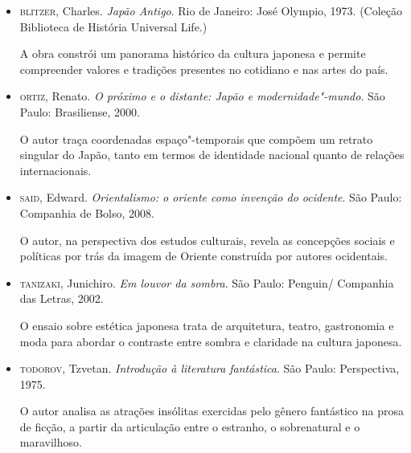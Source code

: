 \documentclass[12pt]{extarticle}
\begin{document}
\begin{itemize}
\item\textsc{blitzer}, Charles. \textit{Japão Antigo}. Rio de Janeiro: José Olympio,
1973. (Coleção Biblioteca de História Universal Life.)

  A obra constrói um panorama histórico da cultura japonesa e permite
  compreender valores e tradições presentes no cotidiano e nas artes do
  país.

\item\textsc{ortiz}, Renato. \textit{O próximo e o distante: Japão e
modernidade"-mundo}. São Paulo: Brasiliense, 2000.

  O autor traça coordenadas espaço"-temporais que compõem um retrato
  singular do Japão, tanto em termos de identidade nacional quanto de
  relações internacionais.

\item\textsc{said}, Edward. \textit{Orientalismo: o oriente como invenção do
ocidente}. São Paulo: Companhia de Bolso, 2008.

  O autor, na perspectiva dos estudos culturais, revela as concepções
  sociais e políticas por trás da imagem de Oriente construída por
  autores ocidentais.

\item\textsc{tanizaki}, Junichiro. \textit{Em louvor da sombra}. São Paulo: Penguin/
Companhia das Letras, 2002.

  O ensaio sobre estética japonesa trata de arquitetura, teatro,
  gastronomia e moda para abordar o contraste entre sombra e claridade
  na cultura japonesa.

\item\textsc{todorov}, Tzvetan. \textit{Introdução à literatura fantástica}. São
Paulo: Perspectiva, 1975.

  O autor analisa as atrações insólitas exercidas pelo gênero fantástico
  na prosa de ficção, a partir da articulação entre o estranho, o
  sobrenatural e o maravilhoso.
\end{itemize}
\end{document}
